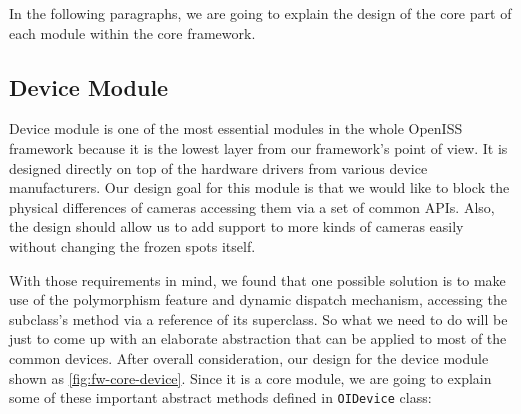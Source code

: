 In the following paragraphs, we are going to explain the design of the core part of
each module within the core framework.

\subsection{Device Module}
\label{sec:fw-design-core-device}

Device module is one of the most essential modules in the whole OpenISS
framework because it is the lowest layer from our framework's point of view. It
is designed directly on top of the hardware drivers from various device
manufacturers.
Our design goal for this module is that we would like to block the physical
differences of cameras accessing them via a set of common APIs. Also, the
design should allow us to add support to more kinds of cameras easily without
changing the frozen spots itself.

With those requirements in mind, we found that one possible solution is to make
use of the polymorphism feature and dynamic dispatch mechanism, accessing the
subclass's method via a reference of its superclass. So what we need to do
will be just to come up with an elaborate abstraction that can be applied to
most of the common devices. After overall consideration, our design for the device
module shown as \autoref{fig:fw-core-device}. Since it is a core module, we are
going to explain some of these important abstract methods defined
in \texttt{OIDevice} class:

